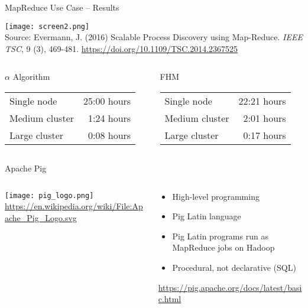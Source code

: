 \documentclass[ignorenonframetext,xcolor=x11names]{beamer}
\begin{document}
\begin{frame}{MapReduce Use Case -- Results}
\begin{center}
\texttt{[image: screen2.png]} \\
\scriptsize
\vspace{\baselineskip}
Source: Evermann, J. (2016) Scalable Process Discovery using Map-Reduce. \emph{IEEE TSC}, 9 (3), 469-481. \footnotesize \url{https://doi.org/10.1109/TSC.2014.2367525}
\end{center}
\small
\begin{columns}
\begin{column}{.47\textwidth}
\begin{block}{$\alpha$ Algorithm}
\begin{tabular}{lr} \hline
Single node & 25:00 hours \\
Medium cluster & 1:24 hours \\
Large cluster & 0:08 hours \\ \hline
\end{tabular}
\end{block}
\end{column}

\begin{column}{.47\textwidth}
\begin{block}{FHM}
\begin{tabular}{lr} \hline
Single node & 22:21 hours\\
Medium cluster & 2:01 hours \\
Large cluster & 0:17 hours \\ \hline
\end{tabular}
\end{block}
\end{column}
\end{columns}
\end{frame}


\begin{frame}{Apache Pig}
\begin{columns}
\begin{column}{.3\textwidth}
\centering
\texttt{[image: pig\_logo.png]} \\
\tiny\url{https://en.wikipedia.org/wiki/File:Apache_Pig_Logo.svg}
\end{column}
\begin{column}{.7\textwidth}
\begin{itemize}
   \item High-level programming
   \item Pig Latin language
   \item Pig Latin programs run as MapReduce jobs on Hadoop
   \item Procedural, not declarative (SQL)
\end{itemize}

\vspace{\baselineskip}
\url{https://pig.apache.org/docs/latest/basic.html}
\end{column}
\end{columns}
\end{frame}
\end{document}
